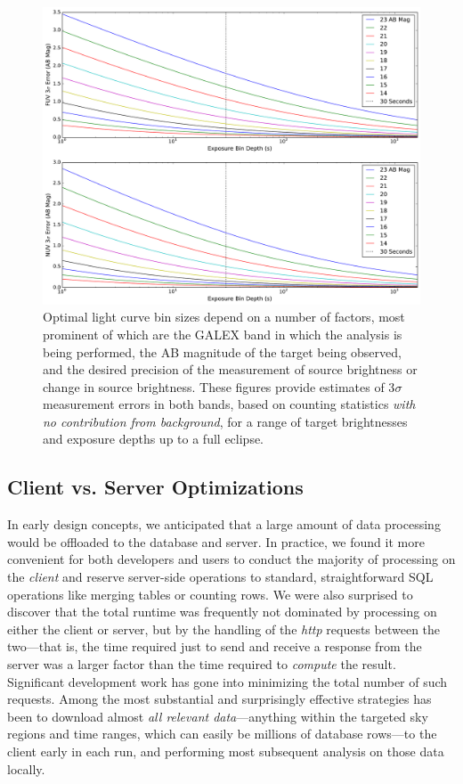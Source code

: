 \documentclass[preprint]{aastex}
\begin{document}
\clearpage
\begin{figure}[h]
\includegraphics[scale=0.49]{Fig11.pdf}
\caption{Optimal light curve bin sizes depend on a number of factors, most prominent of which are the GALEX band in which the analysis is being performed, the AB magnitude of the target being observed, and the desired precision of the measurement of source brightness or change in source brightness. These figures provide estimates of 3$\sigma$ measurement errors in both bands, based on counting statistics \emph{with no contribution from background}, for a range of target brightnesses and exposure depths up to a full eclipse.
\label{sigmadetlim}}
\end{figure}
\clearpage

\subsection{Client vs. Server Optimizations}
\label{speedopt}
In early design concepts, we anticipated that a large amount of data processing would be offloaded to the database and server. In practice, we found it more convenient for both developers and users to conduct the majority of processing on the \emph{client} and reserve server-side operations to standard, straightforward SQL operations like merging tables or counting rows. We were also surprised to discover that the total runtime was frequently not dominated by processing on either the client or server, but by the handling of the \emph{http} requests between the two---that is, the time required just to send and receive a response from the server was a larger factor than the time required to \emph{compute} the result. Significant development work has gone into minimizing the total number of such requests. Among the most substantial and surprisingly effective strategies has been to download almost \emph{all relevant data}---anything within the targeted sky regions and time ranges, which can easily be millions of database rows---to the client early in each run, and performing most subsequent analysis on those data locally.
\end{document}

